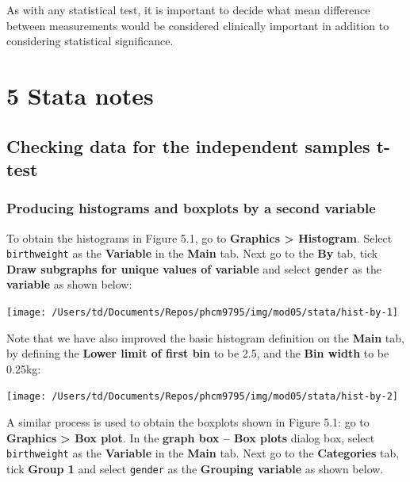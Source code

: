 \documentclass[
]{memoir}
\begin{document}
As with any statistical test, it is important to decide what mean difference between measurements would be considered clinically important in addition to considering statistical significance.

\hypertarget{stata-notes-3}{%
\chapter*{\texorpdfstring{\textbf{5} Stata notes}{5 Stata notes}}\label{stata-notes-3}}

\hypertarget{checking-data-for-the-independent-samples-t-test}{%
\section{Checking data for the independent samples t-test}\label{checking-data-for-the-independent-samples-t-test}}

\hypertarget{producing-histograms-and-boxplots-by-a-second-variable}{%
\subsection{Producing histograms and boxplots by a second variable}\label{producing-histograms-and-boxplots-by-a-second-variable}}

To obtain the histograms in Figure 5.1, go to \textbf{Graphics \textgreater{} Histogram}. Select \texttt{birthweight} as the \textbf{Variable} in the \textbf{Main} tab. Next go to the \textbf{By} tab, tick \textbf{Draw subgraphs for unique values of variable} and select \texttt{gender} as the \textbf{variable} as shown below:

\texttt{[image: /Users/td/Documents/Repos/phcm9795/img/mod05/stata/hist-by-1]}

Note that we have also improved the basic histogram definition on the \textbf{Main} tab, by defining the \textbf{Lower limit of first bin} to be 2.5, and the \textbf{Bin width} to be 0.25kg:

\texttt{[image: /Users/td/Documents/Repos/phcm9795/img/mod05/stata/hist-by-2]}

A similar process is used to obtain the boxplots shown in Figure 5.1: go to \textbf{Graphics \textgreater{} Box plot}. In the \textbf{graph box -- Box plots} dialog box, select \texttt{birthweight} as the \textbf{Variable} in the \textbf{Main} tab. Next go to the \textbf{Categories} tab, tick \textbf{Group 1} and select \texttt{gender} as the \textbf{Grouping variable} as shown below.
\end{document}
